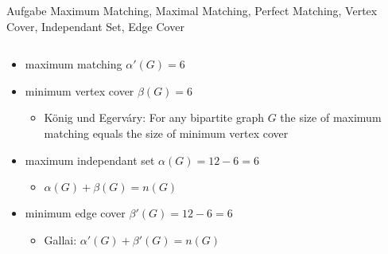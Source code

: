 \begin{frame}[allowframebreaks]{Aufgabe \thesection}{\scriptsize Maximum Matching, Maximal Matching, Perfect Matching, Vertex Cover, Independant Set, Edge Cover}
\begin{solutionnoinc}
\begin{columns}
\begin{column}{0.5\textwidth}
      \end{column}
      \begin{column}{0.5\textwidth}
      \end{column}
    \end{columns}
  \end{solutionnoinc}
  \begin{solution}
  \end{solution}
  \begin{solution}
    \begin{columns}
      \begin{column}{0.5\textwidth}
        \begin{itemize}
          \item maximum matching $\alpha'(G) = 6$
          \item minimum vertex cover $\beta(G) = 6$
          \begin{itemize}
            \item \alert{König und Egerváry:} For any bipartite graph $G$ the size of maximum matching equals the size of minimum vertex cover
          \end{itemize}
          \item maximum independant set $\alpha(G) = 12 - 6 = 6$ 
          \begin{itemize}
            \item $\alpha(G) + \beta(G) = n(G)$
          \end{itemize}
          \item minimum edge cover $\beta'(G) = 12 - 6 = 6$
          \begin{itemize}
            \item \alert{Gallai:} $\alpha'(G) + \beta'(G) = n(G)$
          \end{itemize}
        \end{itemize}
      \end{column}
      \begin{column}{0.5\textwidth}
      \end{column}
    \end{columns}
  \end{solution}
  \begin{solutionnoinc}
  \end{solutionnoinc}
  \begin{solution}
  \end{solution}
\end{frame}
